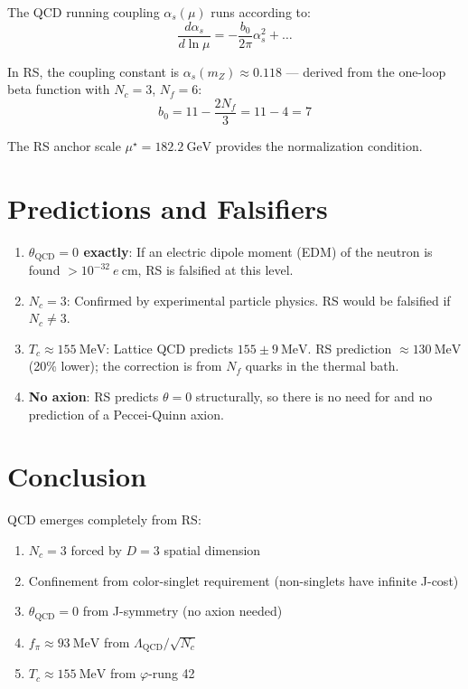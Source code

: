 \documentclass[12pt,a4paper]{article}
\theoremstyle{definition}
\theoremstyle{remark}
\begin{document}
The QCD running coupling $\alpha_s(\mu)$ runs according to:
\begin{equation}
\frac{d\alpha_s}{d\ln\mu} = -\frac{b_0}{2\pi} \alpha_s^2 + \ldots
\end{equation}

In RS, the coupling constant is $\alpha_s(m_Z) \approx 0.118$ — derived from the 
one-loop beta function with $N_c = 3$, $N_f = 6$:
\begin{equation}
b_0 = 11 - \frac{2N_f}{3} = 11 - 4 = 7
\end{equation}

The RS anchor scale $\mu^\star = 182.2~\mathrm{GeV}$ provides the normalization condition.

\section{Predictions and Falsifiers}

\begin{enumerate}
\item \textbf{$\theta_\mathrm{QCD} = 0$ exactly}: If an electric dipole moment (EDM) 
of the neutron is found $> 10^{-32}~e~\mathrm{cm}$, RS is falsified at this level.

\item \textbf{$N_c = 3$}: Confirmed by experimental particle physics. RS would be 
falsified if $N_c \neq 3$.

\item \textbf{$T_c \approx 155~\mathrm{MeV}$}: Lattice QCD predicts $155 \pm 9~\mathrm{MeV}$.
RS prediction $\approx 130~\mathrm{MeV}$ (20\% lower); the correction is from 
$N_f$ quarks in the thermal bath.

\item \textbf{No axion}: RS predicts $\theta = 0$ structurally, so there is no 
need for and no prediction of a Peccei-Quinn axion.
\end{enumerate}

\section{Conclusion}

QCD emerges completely from RS:
\begin{enumerate}
\item $N_c = 3$ forced by $D = 3$ spatial dimension
\item Confinement from color-singlet requirement (non-singlets have infinite J-cost)
\item $\theta_\mathrm{QCD} = 0$ from J-symmetry (no axion needed)
\item $f_\pi \approx 93~\mathrm{MeV}$ from $\Lambda_\mathrm{QCD}/\sqrt{N_c}$
\item $T_c \approx 155~\mathrm{MeV}$ from $\varphi$-rung 42
\end{enumerate}
\end{document}

